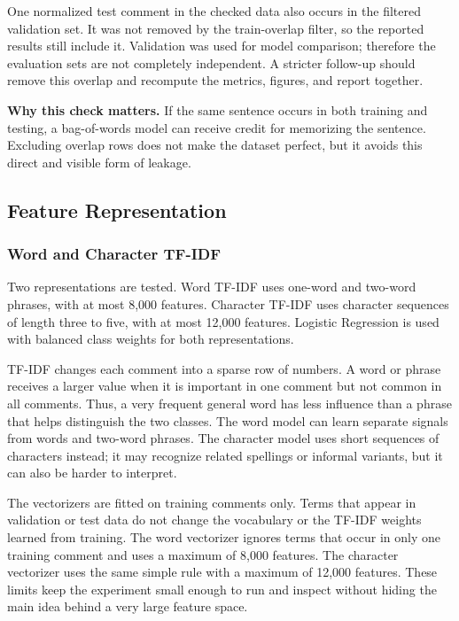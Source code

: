 \documentclass[oneside]{hcmut-report}
\begin{document}
One normalized test comment in the checked data also occurs in the filtered validation set. It was not removed by the train-overlap filter, so the reported results still include it. Validation was used for model comparison; therefore the evaluation sets are not completely independent. A stricter follow-up should remove this overlap and recompute the metrics, figures, and report together.

\begin{importantbox}
\textbf{Why this check matters.} If the same sentence occurs in both training and testing, a bag-of-words model can receive credit for memorizing the sentence. Excluding overlap rows does not make the dataset perfect, but it avoids this direct and visible form of leakage.
\end{importantbox}

\subsection{Feature Representation}

\subsubsection{Word and Character TF-IDF}

Two representations are tested. Word TF-IDF uses one-word and two-word phrases, with at most 8,000 features. Character TF-IDF uses character sequences of length three to five, with at most 12,000 features. Logistic Regression is used with balanced class weights for both representations.

TF-IDF changes each comment into a sparse row of numbers. A word or phrase receives a larger value when it is important in one comment but not common in all comments. Thus, a very frequent general word has less influence than a phrase that helps distinguish the two classes. The word model can learn separate signals from words and two-word phrases. The character model uses short sequences of characters instead; it may recognize related spellings or informal variants, but it can also be harder to interpret.

The vectorizers are fitted on training comments only. Terms that appear in validation or test data do not change the vocabulary or the TF-IDF weights learned from training. The word vectorizer ignores terms that occur in only one training comment and uses a maximum of 8,000 features. The character vectorizer uses the same simple rule with a maximum of 12,000 features. These limits keep the experiment small enough to run and inspect without hiding the main idea behind a very large feature space.
\end{document}
